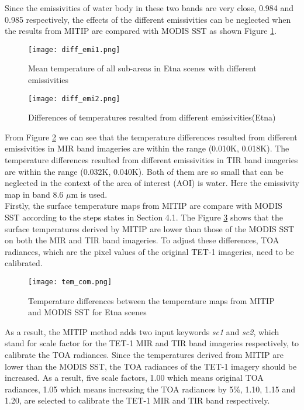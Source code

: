 \noindent Since the emissivities of water body in these two bands are very close, 0.984  and 0.985 respectively, the effects of the different emissivities can be neglected when the results from MITIP are compared with MODIS SST as shown Figure \ref{fig:tem_diff_emi1}.\\

\begin{figure}[!htbp]
\centering\texttt{[image: diff\_emi1.png]}
\caption{Mean temperature of all sub-areas in Etna scenes with different emissivities}
\label{fig:tem_diff_emi1}
\end{figure}

\begin{figure}[!htbp]
\centering\texttt{[image: diff\_emi2.png]}
\caption{Differences of temperatures resulted from different emissivities(Etna)}
\label{fig:tem_diff_emi2}
\end{figure}

\noindent From Figure \ref{fig:tem_diff_emi2} we can see that the temperature differences resulted from different emissivities in MIR band imageries are within the range (0.010K, 0.018K). The temperature differences resulted from different emissivities in TIR band imageries are within the range (0.032K, 0.040K). Both of them are so small that can be neglected in the context of the area of interest (AOI) is water. Here the emissivity map in band 8.6 $\mu$m is used.\\

\noindent Firstly, the surface temperature maps from MITIP are compare with MODIS SST according to the steps states in Section 4.1. The Figure \ref{fig:tem_com} shows that the surface temperatures derived by MITIP are lower than those of the MODIS SST on both the MIR and TIR band imageries. To adjust these differences, TOA radiances, which are the pixel values of the original TET-1 imageries, need to be calibrated.\\

\begin{figure}[!htbp]
\centering\texttt{[image: tem\_com.png]}
\caption{Temperature differences between the temperature maps from MITIP and MODIS SST for Etna scenes}
\label{fig:tem_com}
\end{figure}

\noindent As a result, the MITIP method adds two input keywords \emph{sc1} and \emph{sc2}, which stand for scale factor for the TET-1 MIR and TIR band imageries respectively, to calibrate the TOA radiances. Since the temperatures derived from MITIP are lower than the MODIS SST, the TOA radiances of the TET-1 imagery should be increased. As a result, five scale factors, 1.00 which means original TOA radiances, 1.05 which means increasing the TOA radiances by 5\%, 1.10, 1.15 and 1.20, are selected to calibrate the TET-1 MIR and TIR band respectively.\\

